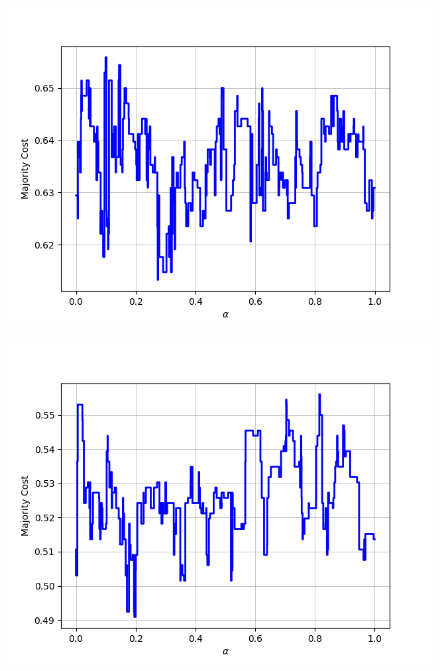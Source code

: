 \begin{figure}[H]
\begin{minipage}{.24\textwidth}
  {\includegraphics[width=\linewidth]{plots/omniglot-intra-ac-cnn/Braille}}
\end{minipage}
\begin{minipage}{.24\textwidth}
  \centering
  {\includegraphics[width=\linewidth]{plots/omniglot-intra-ac-cnn/Burmese_(Myanmar)}}
\end{minipage}
\begin{minipage}{.24\textwidth}
  \centering

\end{minipage}
\end{figure}
